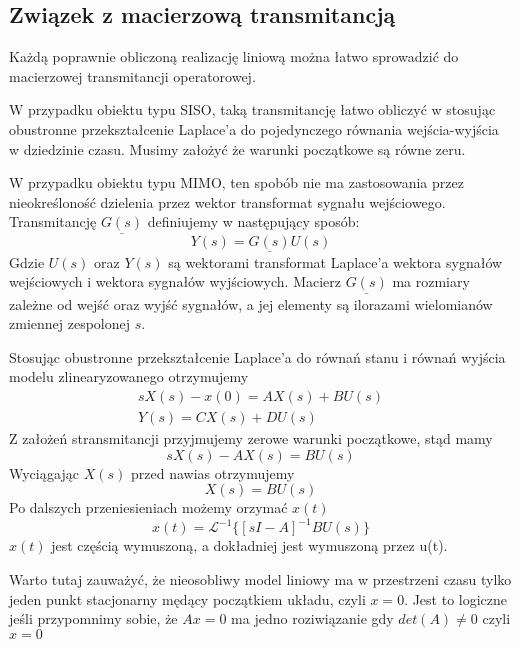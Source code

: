 \documentclass{article}
\begin{document}
	\subsection{Związek z macierzową transmitancją}
		Każdą poprawnie obliczoną realizację liniową można łatwo sprowadzić do
		macierzowej transmitancji operatorowej.

		W przypadku obiektu typu SISO, taką transmitancję łatwo obliczyć w stosując
		obustronne przekształcenie Laplace'a do pojedynczego równania wejścia-wyjścia
		w dziedzinie czasu. Musimy założyć że warunki początkowe są równe zeru.

		W przypadku obiektu typu MIMO, ten spobób nie ma zastosowania przez nieokreśloność
		dzielenia przez wektor transformat sygnału wejściowego.
		Transmitancję $\underline{G(s)}$ definiujemy w następujący sposób:
		\begin{equation}
			Y(s) = \underline{G(s)}U(s)
		\end{equation}
		Gdzie $U(s)$ oraz $Y(s)$ są wektorami transformat Laplace'a wektora sygnałów
		wejściowych i wektora sygnałów wyjściowych. Macierz $\underline{G(s)}$
		ma rozmiary zależne od wejść oraz wyjść sygnałów, a jej elementy są ilorazami
		wielomianów zmiennej zespolonej $s$.

		Stosując obustronne przekształcenie Laplace'a do równań stanu i równań wyjścia
		modelu zlinearyzowanego otrzymujemy
		\begin{align*}
			sX(s)-x(0) = AX(s) + BU(s) \\ 
			Y(s) = CX(s) + DU(s)
		\end{align*}
		Z założeń stransmitancji przyjmujemy zerowe warunki początkowe, stąd mamy
		\begin{equation}
			sX(s) - A X(s) = BU(s)
		\end{equation}
		Wyciągając $X(s)$ przed nawias otrzymujemy
		\begin{equation}
			[sI-A]X(s) = BU(s)
		\end{equation}
		Po dalszych przeniesieniach możemy orzymać $x(t)$
		\begin{equation}
			x(t) = \mathcal{L}^{-1}\{ [sI-A]^{-1}BU(s)\}
		\end{equation}
		$x(t)$ jest częścią wymuszoną, a dokładniej jest wymuszoną przez u(t).

		Warto tutaj zauważyć, że nieosobliwy model liniowy ma w przestrzeni czasu 
		tylko jeden punkt stacjonarny mędący początkiem układu, czyli $x=0$.
		Jest to logiczne jeśli przypomnimy sobie, że $Ax=0$ ma jedno roziwiązanie
		gdy $det(A) \neq 0$ czyli $x=0$
\end{document}

